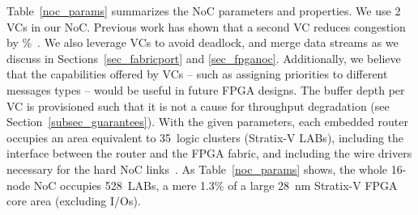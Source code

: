 Table~\ref{noc_params} summarizes the NoC parameters and properties.
We use 2 VCs in our NoC.
Previous work has shown that a second VC reduces congestion by \%~\cite{fpl}.
We also leverage VCs to avoid deadlock, and merge data streams as we discuss in Sections~\ref{sec_fabricport} and \ref{sec_fpganoc}.
Additionally, we believe that the capabilities offered by VCs -- such as assigning priorities to different messages types -- would be useful in future FPGA designs.
The buffer depth per VC is provisioned such that it is not a cause for throughput degradation (see Section~\ref{subsec_guarantees}).
With the given parameters, each embedded router occupies an area equivalent to 35~logic clusters (Stratix-V LABs), including the interface between the router and the FPGA fabric, and including the wire drivers necessary for the hard NoC links~\cite{trets}.
As Table~\ref{noc_params} shows, the whole 16-node NoC occupies 528~LABs, a mere 1.3\% of a large 28~nm Stratix-V FPGA core area (excluding I/Os).

%
%
